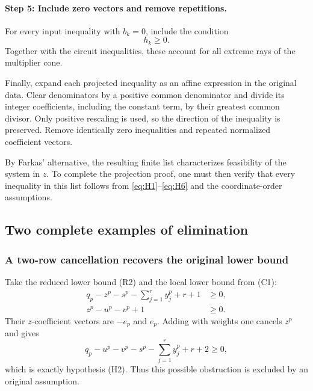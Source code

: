 \documentclass[a4paper,11pt]{amsart}
\numberwithin{equation}{section}
\theoremstyle{definition}
\theoremstyle{remark}
\begin{document}
\paragraph{Step 5: Include zero vectors and remove repetitions.}
For every input inequality with $b_k=0$, include the condition
\[
 h_k\ge0.
\]
Together with the circuit inequalities, these account for all extreme
rays of the multiplier cone.

Finally, expand each projected inequality as an affine expression in
the original data. Clear denominators by a positive common
denominator and divide its integer coefficients, including the
constant term, by their greatest common divisor.
Only positive rescaling is used, so the direction of the inequality
is preserved. Remove identically zero inequalities and repeated
normalized coefficient vectors.

By Farkas' alternative, the resulting finite list characterizes
feasibility of the system in $z$. To complete the projection proof,
one must then verify that every inequality in this list follows from
\eqref{eq:H1}--\eqref{eq:H6} and the coordinate-order assumptions.




\subsection{Two complete examples of elimination}\label{subsec:merge-examples}
\subsubsection{A two-row cancellation recovers the original lower bound}
Take the reduced lower bound (R2) and the local lower bound from (C1):
\begin{align*}
 q_p-z^p-s^p-\sum_{j=1}^r y_j^p+r+1&\ge0,\\
 z^p-u^p-v^p+1&\ge0.
\end{align*}
Their $z$-coefficient vectors are $-e_p$ and $e_p$. Adding with weights one
cancels $z^p$ and gives
\[
 q_p-u^p-v^p-s^p-\sum_{j=1}^r y_j^p+r+2\ge0,
\]
which is exactly hypothesis (H2). Thus this possible obstruction is excluded
by an original assumption.
\end{document}
